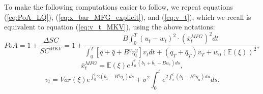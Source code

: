 \documentclass[11pt]{article}
\begin{document}
To make the following computations easier to follow, we repeat equations (\ref{eq:PoA_LQ}), (\ref{eq:x_bar_MFG_explicit}), and (\ref{eq:v_t}), which we recall is equivalent to  equation (\ref{eq:v_t_MKV}), using the above notations:
\begin{equation}
PoA =1+ \frac{\Delta SC}{SC^{MKV}}= 1 +  \frac{ \displaystyle B\int_0^T (u_t-w_t)^2 \cdot (\bar{x}_t^{MFG})^2 dt }{\displaystyle \int_0^T \left[q+\bar{q} + B^{\eta} \eta_t^2 \right] v_t dt + (q_T + \bar{q}_T) v_T + w_0 (\mathbb{E}(\xi))^2},
\label{eq:PoA_LQ_new_notation}
\end{equation}
\begin{equation}
\bar{x}^{MFG}_t=\mathbb{E}(\xi) e^{\int_0^t(b_1+\bar{b}_1-Bu_s)ds},
\label{eq:x_bar_MFG_explicit_new_notation}
\end{equation}
\begin{equation}
v_t=Var(\xi)e^{\int_0^t 2(b_1-B^{\eta} \eta_s)ds}+\sigma^2 \int_0^t e^{2 \int_s^t (b_1-B^{\eta}\eta_u) du}ds.
\label{eq:v_t_new_notation}
\end{equation}
\end{document}
